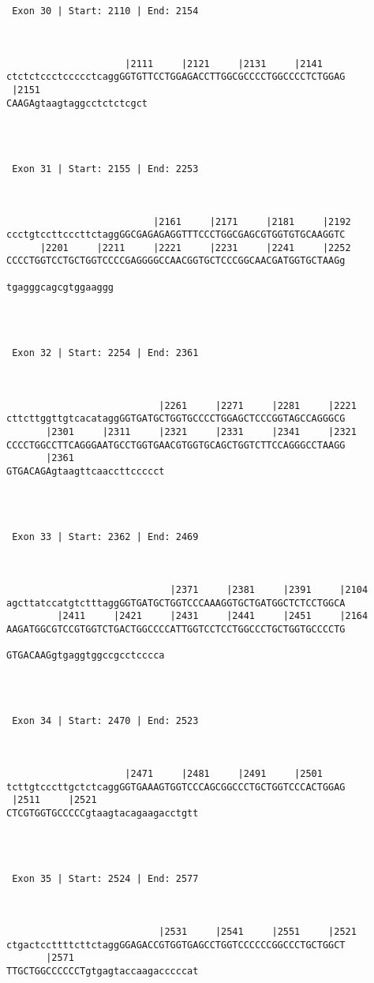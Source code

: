 \documentclass{article}
\begin{document}
\begin{Verbatim}
 Exon 30 | Start: 2110 | End: 2154 



                     |2111     |2121     |2131     |2141    
ctctctccctccccctcaggGGTGTTCCTGGAGACCTTGGCGCCCCTGGCCCCTCTGGAG
 |2151                   
CAAGAgtaagtaggcctctctcgct




 Exon 31 | Start: 2155 | End: 2253 



                          |2161     |2171     |2181     |2192
ccctgtccttcccttctaggGGCGAGAGAGGTTTCCCTGGCGAGCGTGGTGTGCAAGGTC
      |2201     |2211     |2221     |2231     |2241     |2252
CCCCTGGTCCTGCTGGTCCCCGAGGGGCCAACGGTGCTCCCGGCAACGATGGTGCTAAGg
                   
tgagggcagcgtggaaggg




 Exon 32 | Start: 2254 | End: 2361 



                           |2261     |2271     |2281     |2221
cttcttggttgtcacataggGGTGATGCTGGTGCCCCTGGAGCTCCCGGTAGCCAGGGCG
       |2301     |2311     |2321     |2331     |2341     |2321
CCCCTGGCCTTCAGGGAATGCCTGGTGAACGTGGTGCAGCTGGTCTTCCAGGGCCTAAGG
       |2361                
GTGACAGAgtaagttcaaccttccccct




 Exon 33 | Start: 2362 | End: 2469 



                             |2371     |2381     |2391     |2104
agcttatccatgtctttaggGGTGATGCTGGTCCCAAAGGTGCTGATGGCTCTCCTGGCA
         |2411     |2421     |2431     |2441     |2451     |2164
AAGATGGCGTCCGTGGTCTGACTGGCCCCATTGGTCCTCCTGGCCCTGCTGGTGCCCCTG
                            
GTGACAAGgtgaggtggccgcctcccca




 Exon 34 | Start: 2470 | End: 2523 



                     |2471     |2481     |2491     |2501    
tcttgtcccttgctctcaggGGTGAAAGTGGTCCCAGCGGCCCTGCTGGTCCCACTGGAG
 |2511     |2521                  
CTCGTGGTGCCCCCgtaagtacagaagacctgtt




 Exon 35 | Start: 2524 | End: 2577 



                           |2531     |2541     |2551     |2521
ctgactccttttcttctaggGGAGACCGTGGTGAGCCTGGTCCCCCCGGCCCTGCTGGCT
       |2571                      
TTGCTGGCCCCCCTgtgagtaccaagacccccat





\end{Verbatim}
\end{document}
